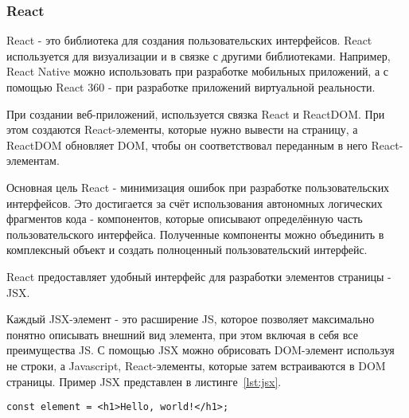\subsubsection{React}

React - это библиотека для создания пользовательских интерфейсов. React используется для визуализации и в связке с другими библиотеками. Например, React Native можно использовать при разработке мобильных приложений, а с помощью React 360 - при разработке приложений виртуальной реальности.

При создании веб-приложений, используется связка React и ReactDOM. При этом создаются React-элементы, которые нужно вывести на страницу, а ReactDOM обновляет DOM, чтобы он соответствовал переданным в него React-элементам.

Основная цель React - минимизация ошибок при разработке пользовательских интерфейсов. Это достигается за счёт использования автономных логических фрагментов кода - компонентов, которые описывают определённую часть пользовательского интерфейса. Полученные компоненты можно объединить в комплексный объект и создать полноценный пользовательский интерфейс.

React предоставляет удобный интерфейс для разработки элементов страницы - JSX.

Каждый JSX-элемент - это расширение JS, которое позволяет максимально понятно описывать внешний вид элемента, при этом включая в себя все преимущества JS. С помощью JSX можно обрисовать DOM-элемент используя не строки, а Javascript, React-элементы, которые затем встраиваются в DOM страницы. Пример JSX представлен в листинге~\ref{lst:jsx}.

\begin{lstlisting}[style=ES6, caption={Пример JSX-элемента}, label = {lst:jsx}]
const element = <h1>Hello, world!</h1>;
\end{lstlisting}

